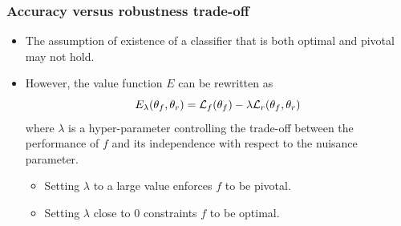 \documentclass{beamer}
\begin{document}
\begin{frame}
    \frametitle{Accuracy versus robustness trade-off}

    \begin{itemize}
        \item The assumption of existence of a classifier that is both optimal and pivotal may not hold.

              \vspace{0.5cm}

        \item However, the value function $E$ can be rewritten as
            $$E_\lambda(\theta_f, \theta_r) = {\cal L}_f(\theta_f) - \lambda {\cal L}_r(\theta_f, \theta_r)$$
            where $\lambda$ is a hyper-parameter controlling the trade-off between
            the performance of $f$ and its independence with respect to the nuisance
            parameter.

        \begin{itemize}
            \item Setting $\lambda$ to a large value enforces $f$ to be pivotal.
            \item Setting $\lambda$ close to $0$ constraints $f$ to be optimal.
        \end{itemize}
    \end{itemize}
\end{frame}



\end{document}
